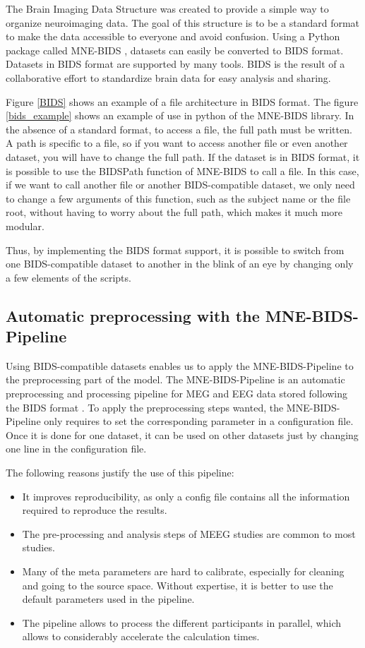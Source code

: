 The Brain Imaging Data Structure was created to provide a simple way to organize neuroimaging data. The goal of this structure is to be a standard format to make the data accessible to everyone and avoid confusion. Using a Python package called MNE-BIDS \cite{appelhoff2019mne}, datasets can easily be converted to BIDS format. Datasets in BIDS format are supported by many tools. BIDS is the result of a collaborative effort to standardize brain data for easy analysis and sharing.
 
Figure \ref{BIDS} shows an example of a file architecture in BIDS format. The figure \ref{bids_example} shows an example of use in python of the MNE-BIDS library. In the absence of a standard format, to access a file, the full path must be written. A path is specific to a file, so if you want to access another file or even another dataset, you will have to change the full path. If the dataset is in BIDS format, it is possible to use the BIDSPath function of MNE-BIDS to call a file. In this case, if we want to call another file or another BIDS-compatible dataset, we only need to change a few arguments of this function, such as the subject name or the file root, without having to worry about the full path, which makes it much more modular.
 
Thus, by implementing the BIDS format support, it is possible to switch from one BIDS-compatible dataset to another in the blink of an eye by changing only a few elements of the scripts.
 
\subsection{Automatic preprocessing with the MNE-BIDS-Pipeline}
 
Using BIDS-compatible datasets enables us to apply the MNE-BIDS-Pipeline to the preprocessing part of the model. The MNE-BIDS-Pipeline is an automatic preprocessing and processing pipeline for MEG and EEG data stored following the BIDS format \cite{gorgolewski2016brain}. To apply the preprocessing steps wanted, the MNE-BIDS-Pipeline only requires to set the corresponding parameter in a configuration file. Once it is done for one dataset, it can be used on other datasets just by changing one line in the configuration file.
 
The following reasons justify the use of this pipeline:
\begin{itemize}
   \item It improves reproducibility, as only a config file contains all the information required to reproduce the results.
   \item The pre-processing and analysis steps of MEEG studies are common to most studies.
   \item Many of the meta parameters are hard to calibrate, especially for cleaning and going to the source space. Without expertise, it is better to use the default parameters used in the pipeline.
   \item The pipeline allows to process the different participants in parallel, which allows to considerably accelerate the calculation times.
\end{itemize}
